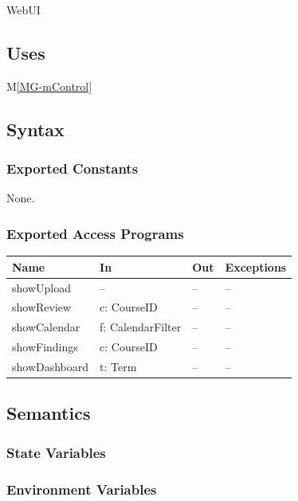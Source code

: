 \documentclass[12pt, titlepage]{article}
\newcommand{\mref}[1]{M\ref{MG-#1}}
\begin{document}
WebUI

\subsection{Uses}

\mref{mControl}

\subsection{Syntax}

\subsubsection{Exported Constants}

None.

\subsubsection{Exported Access Programs}

\begin{center}\small
\begin{tabular}{>{\raggedright\arraybackslash}p{3.3cm} >{\raggedright\arraybackslash}p{4.1cm} >{\raggedright\arraybackslash}p{3.4cm} >{\raggedright\arraybackslash}p{4.0cm}}
\hline
\textbf{Name} & \textbf{In} & \textbf{Out} & \textbf{Exceptions} \\
\hline
showUpload & -- & -- & -- \\
showReview & c: CourseID & -- & -- \\
showCalendar & f: CalendarFilter & -- & -- \\
showFindings & c: CourseID & -- & -- \\
showDashboard & t: Term & -- & -- \\
\hline
\end{tabular}
\end{center}

\subsection{Semantics}

\subsubsection{State Variables}


\subsubsection{Environment Variables}
\end{document}

